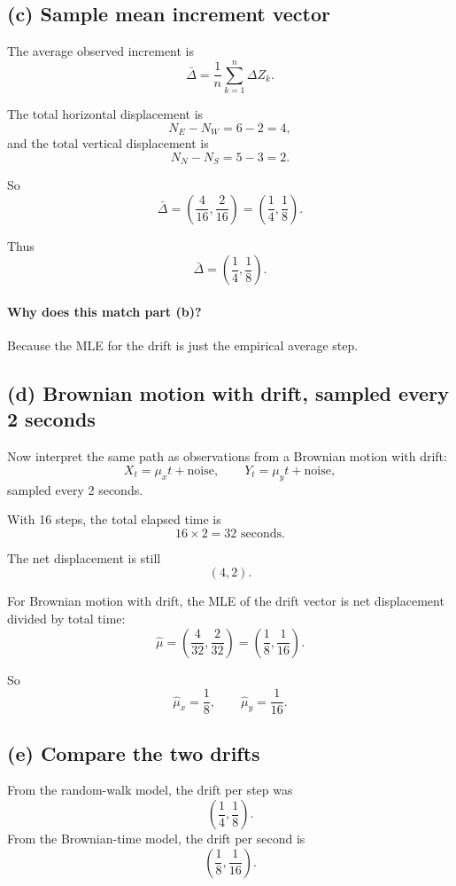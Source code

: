 \documentclass[11pt]{article}
\begin{document}
\subsection*{(c) Sample mean increment vector}

The average observed increment is
\[
\bar\Delta=\frac1n\sum_{k=1}^n \Delta Z_k.
\]

The total horizontal displacement is
\[
N_E-N_W=6-2=4,
\]
and the total vertical displacement is
\[
N_N-N_S=5-3=2.
\]

So
\[
\bar\Delta
=
\left(
\frac{4}{16},\frac{2}{16}
\right)
=
\left(\frac14,\frac18\right).
\]

Thus
\[
\boxed{
\bar\Delta=\left(\frac14,\frac18\right).
}
\]

\paragraph{Why does this match part (b)?}

Because the MLE for the drift is just the empirical average step.

\subsection*{(d) Brownian motion with drift, sampled every 2 seconds}

Now interpret the same path as observations from a Brownian motion with drift:
\[
X_t=\mu_x t + \text{noise}, \qquad
Y_t=\mu_y t + \text{noise},
\]
sampled every 2 seconds.

With 16 steps, the total elapsed time is
\[
16\times 2 = 32 \text{ seconds}.
\]

The net displacement is still
\[
(4,2).
\]

For Brownian motion with drift, the MLE of the drift vector is net displacement divided by total time:
\[
\hat\mu
=
\left(
\frac{4}{32},\frac{2}{32}
\right)
=
\left(\frac18,\frac1{16}\right).
\]

So
\[
\boxed{
\hat\mu_x=\frac18,\qquad \hat\mu_y=\frac1{16}.
}
\]

\subsection*{(e) Compare the two drifts}

From the random-walk model, the drift per step was
\[
\left(\frac14,\frac18\right).
\]
From the Brownian-time model, the drift per second is
\[
\left(\frac18,\frac1{16}\right).
\]
\end{document}
